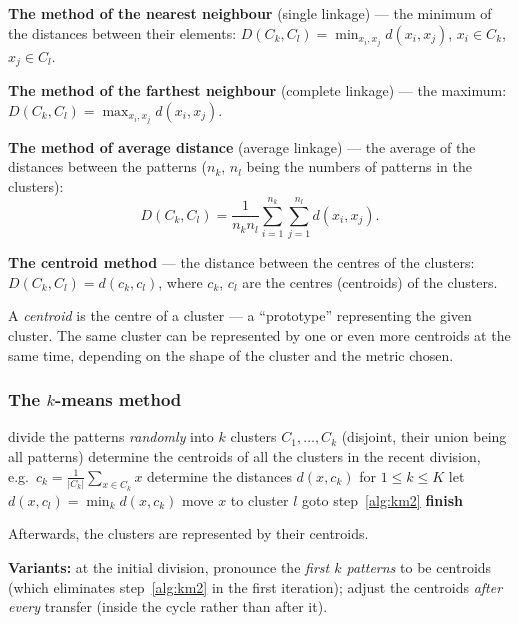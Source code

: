 \documentclass[11pt,a4paper]{article}
\theoremstyle{definition}
\providecommand{\uv}[1]{``#1''}
\begin{document}
\begin{defbox}
\textbf{The method of the nearest neighbour} (single linkage) --- the minimum of the distances
between their elements: $D(C_k,C_l)=\min_{x_i,x_j} d(x_i,x_j)$, $x_i\in C_k$, $x_j\in C_l$.

\textbf{The method of the farthest neighbour} (complete linkage) --- the maximum:
$D(C_k,C_l)=\max_{x_i,x_j} d(x_i,x_j)$.

\textbf{The method of average distance} (average linkage) --- the average of the distances between
the patterns ($n_k$, $n_l$ being the numbers of patterns in the clusters):
\[ D(C_k,C_l)=\frac{1}{n_kn_l}\sum_{i=1}^{n_k}\sum_{j=1}^{n_l} d(x_i,x_j). \]

\textbf{The centroid method} --- the distance between the centres of the clusters:
$D(C_k,C_l)=d(c_k,c_l)$, where $c_k$, $c_l$ are the centres (centroids) of the clusters.
\end{defbox}

A \emph{centroid} is the centre of a cluster --- a \uv{prototype} representing the given cluster.
The same cluster can be represented by one or even more centroids at the same time, depending on
the shape of the cluster and the metric chosen.

\subsubsection{The $k$-means method}

\begin{defbox}
\begin{algorithmic}[1]
\State divide the patterns \emph{randomly} into $k$ clusters $C_1,\dots,C_k$ (disjoint, their
       union being all patterns)
\State \label{alg:km2} determine the centroids of all the clusters in the recent division, e.g.\
       $c_k=\frac{1}{|C_k|}\sum_{x\in C_k}x$
   \State determine the distances $d(x,c_k)$ for $1\le k\le K$
   \State let $d(x,c_l)=\min_k d(x,c_k)$
    \State move $x$ to cluster $l$ \EndIf
\EndFor
{} \State goto step~\ref{alg:km2} \Else \State \textbf{finish} \EndIf
\end{algorithmic}
Afterwards, the clusters are represented by their centroids.

\textbf{Variants:} at the initial division, pronounce the \emph{first $k$ patterns} to be
centroids (which eliminates step~\ref{alg:km2} in the first iteration); adjust the centroids
\emph{after every} transfer (inside the cycle rather than after it).
\end{defbox}
\end{document}

